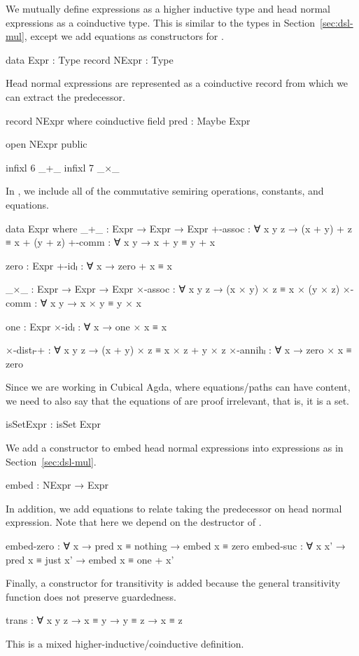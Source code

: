 We mutually define expressions as a higher inductive type and head normal
expressions as a coinductive type. This is similar to the types in
Section~\ref{sec:dsl-mul}, except we add equations as constructors for
.
\begin{AgdaAlign}
\begin{code}
  data Expr : Type
  record NExpr : Type
\end{code}
Head normal expressions are represented as a coinductive record from which we
can extract the predecessor.
\begin{code}
  record NExpr where
    coinductive
    field pred : Maybe Expr
\end{code}
\begin{code}[hide]
  open NExpr public

  infixl 6 _+_
  infixl 7 _×_
\end{code}
In , we include all of the commutative semiring operations,
constants, and equations.
\begin{code}
  data Expr where
    _+_        : Expr → Expr → Expr
    +-assoc    : ∀ x y z → (x + y) + z ≡ x + (y + z)
    +-comm     : ∀ x y → x + y ≡ y + x

    zero       : Expr
    +-idₗ      : ∀ x → zero + x ≡ x

    _×_        : Expr → Expr → Expr
    ×-assoc    : ∀ x y z → (x × y) × z ≡ x × (y × z)
    ×-comm     : ∀ x y → x × y ≡ y × x

    one        : Expr
    ×-idₗ      : ∀ x → one × x ≡ x

    ×-distₗ-+  : ∀ x y z → (x + y) × z ≡ x × z + y × z
    ×-annihₗ   : ∀ x → zero × x ≡ zero
\end{code}
Since we are working in Cubical Agda, where equations\slash paths can have content,
we need to also say that the equations of  are proof
irrelevant, that is, it is a set.
\begin{code}
    isSetExpr  : isSet Expr
\end{code}
We add a constructor to embed head normal expressions into expressions as in
Section~\ref{sec:dsl-mul}.
\begin{code}
    embed : NExpr → Expr
\end{code}
In addition, we add equations to relate taking the predecessor on head normal
expression. Note that here we depend on the destructor  of
.
\begin{code}
    embed-zero  :
      ∀ x → pred x ≡ nothing → embed x ≡ zero
    embed-suc   :
      ∀ x x' → pred x ≡ just x' → embed x ≡ one + x'
\end{code}
Finally, a constructor for transitivity is added because the general
transitivity function does not preserve guardedness.
\begin{code}
    trans : ∀ {x y z} → x ≡ y → y ≡ z → x ≡ z
\end{code}
\end{AgdaAlign}
This is a mixed higher-inductive\slash coinductive definition.

